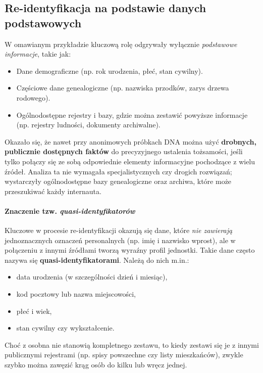 \subsection{Re-identyfikacja na podstawie danych podstawowych}

W omawianym przykładzie kluczową rolę odgrywały wyłącznie \textit{podstawowe informacje}, takie jak:
\begin{itemize}
    \item Dane demograficzne (np. rok urodzenia, płeć, stan cywilny).
    \item Częściowe dane genealogiczne (np. nazwiska przodków, zarys drzewa rodowego).
    \item Ogólnodostępne rejestry i bazy, gdzie można zestawić powyższe informacje (np. rejestry ludności, dokumenty archiwalne).
\end{itemize}

Okazało się, że nawet przy anonimowych próbkach DNA można użyć \textbf{drobnych, publicznie dostępnych faktów} do precyzyjnego ustalenia tożsamości, jeśli tylko połączy się ze sobą odpowiednie elementy informacyjne pochodzące z wielu źródeł. Analiza ta nie wymagała specjalistycznych czy drogich rozwiązań; wystarczyły ogólnodostępne bazy genealogiczne oraz archiwa, które może przeszukiwać każdy internauta.

\paragraph{Znaczenie tzw. \emph{quasi-identyfikatorów}}
Kluczowe w procesie re-identyfikacji okazują się dane, które \emph{nie zawierają} jednoznacznych oznaczeń personalnych (np. imię i nazwisko wprost), ale w połączeniu z innymi źródłami tworzą wyraźny profil jednostki. Takie dane często nazywa się \textbf{quasi-identyfikatorami}. Należą do nich m.in.:
\begin{itemize}
    \item data urodzenia (w szczególności dzień i miesiąc),
    \item kod pocztowy lub nazwa miejscowości,
    \item płeć i wiek,
    \item stan cywilny czy wykształcenie.
\end{itemize}
Choć z osobna nie stanowią kompletnego zestawu, to kiedy zestawi się je z innymi publicznymi rejestrami (np. spisy powszechne czy listy mieszkańców), zwykle szybko można zawęzić krąg osób do kilku lub wręcz jednej.

